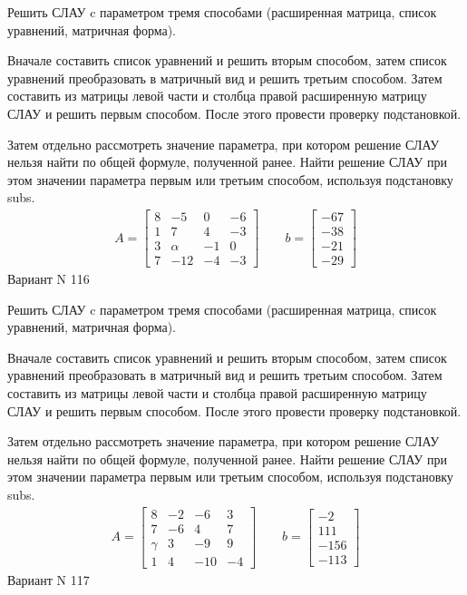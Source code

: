 \documentclass[11pt]{report}
\begin{document}
Решить СЛАУ c параметром тремя способами (расширенная матрица, список уравнений, матричная форма).

Вначале составить список уравнений и решить вторым способом,
затем список уравнений преобразовать в матричный вид и решить третьим способом.
Затем составить из матрицы левой части и столбца правой расширенную матрицу СЛАУ и решить первым способом.
После этого провести проверку подстановкой.

Затем отдельно рассмотреть значение параметра, при котором решение СЛАУ нельзя найти по общей формуле,
полученной ранее.
Найти решение СЛАУ при этом значении параметра первым или третьим способом, используя подстановку subs.
\begin{align*}
    A = \left[\begin{matrix}8 & -5 & 0 & -6\\1 & 7 & 4 & -3\\3 & \alpha & -1 & 0\\7 & -12 & -4 & -3\end{matrix}\right]
\qquad b = \left[\begin{matrix}-67\\-38\\-21\\-29\end{matrix}\right]
\end{align*}
\newpage
Вариант N 116


Решить СЛАУ c параметром тремя способами (расширенная матрица, список уравнений, матричная форма).

Вначале составить список уравнений и решить вторым способом,
затем список уравнений преобразовать в матричный вид и решить третьим способом.
Затем составить из матрицы левой части и столбца правой расширенную матрицу СЛАУ и решить первым способом.
После этого провести проверку подстановкой.

Затем отдельно рассмотреть значение параметра, при котором решение СЛАУ нельзя найти по общей формуле,
полученной ранее.
Найти решение СЛАУ при этом значении параметра первым или третьим способом, используя подстановку subs.
\begin{align*}
    A = \left[\begin{matrix}8 & -2 & -6 & 3\\7 & -6 & 4 & 7\\\gamma & 3 & -9 & 9\\1 & 4 & -10 & -4\end{matrix}\right]
\qquad b = \left[\begin{matrix}-2\\111\\-156\\-113\end{matrix}\right]
\end{align*}
\newpage
Вариант N 117
\end{document}

